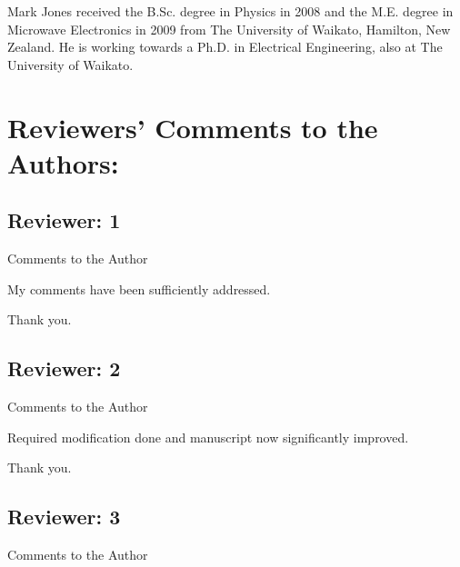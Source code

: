 \documentclass[journal, a4paper]{IEEEtran}
\begin{document}
\begin{IEEEbiography}{Mark Jones}
received the B.Sc. degree in Physics in 2008 and the M.E. degree in Microwave Electronics in 2009 from The University of Waikato, Hamilton, New Zealand.
He is working towards a Ph.D. in Electrical Engineering, also at The University of Waikato.
\end{IEEEbiography}

\section*{Reviewers' Comments to the Authors:}

\subsection*{Reviewer: 1}

Comments to the Author

{
    \color{OliveGreen}
    My comments have been sufficiently addressed.
}

{
    \color{blue}
    Thank you.
}


\subsection*{Reviewer: 2}

Comments to the Author

{
    \color{OliveGreen}
    Required modification done and manuscript now significantly improved.
}

{
    \color{blue}
    Thank you.
}

\subsection*{Reviewer: 3}

Comments to the Author
\end{document}
